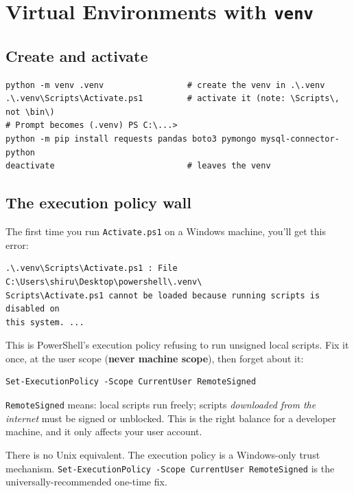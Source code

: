 \documentclass[11pt,a4paper]{article}
\begin{document}
\section{Virtual Environments with \texttt{venv}}

\subsection*{Create and activate}

\begin{lstlisting}[style=pwshstyle]
python -m venv .venv                 # create the venv in .\.venv
.\.venv\Scripts\Activate.ps1         # activate it (note: \Scripts\, not \bin\)
# Prompt becomes (.venv) PS C:\...>
python -m pip install requests pandas boto3 pymongo mysql-connector-python
deactivate                           # leaves the venv
\end{lstlisting}

\subsection*{The execution policy wall}

The first time you run \texttt{Activate.ps1} on a Windows machine,
you'll get this error:

\begin{lstlisting}[style=pwshstyle]
.\.venv\Scripts\Activate.ps1 : File C:\Users\shiru\Desktop\powershell\.venv\
Scripts\Activate.ps1 cannot be loaded because running scripts is disabled on
this system. ...
\end{lstlisting}

This is PowerShell's execution policy refusing to run unsigned local
scripts. Fix it once, at the user scope (\textbf{never machine
scope}), then forget about it:

\begin{lstlisting}[style=pwshstyle]
Set-ExecutionPolicy -Scope CurrentUser RemoteSigned
\end{lstlisting}

\texttt{RemoteSigned} means: local scripts run freely; scripts
\emph{downloaded from the internet} must be signed or unblocked. This
is the right balance for a developer machine, and it only affects
your user account.

\begin{compare}
There is no Unix equivalent. The execution policy is a Windows-only
trust mechanism. \texttt{Set-ExecutionPolicy -Scope CurrentUser
RemoteSigned} is the universally-recommended one-time fix.
\end{compare}
\end{document}
